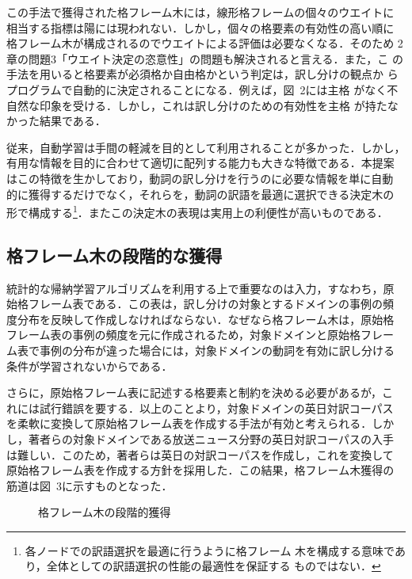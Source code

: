 この手法で獲得された格フレーム木には，線形格フレームの個々のウエイトに
相当する指標は陽には現われない．しかし，個々の格要素の有効性の高い順に
格フレーム木が構成されるのでウエイトによる評価は必要なくなる．そのため
2章の問題3「ウエイト決定の恣意性」の問題も解決されると言える．また，こ
の手法を用いると格要素が必須格か自由格かという判定は，訳し分けの観点か
らプログラムで自動的に決定されることになる．例えば，図~2には主格
がなく不自然な印象を受ける．しかし，これは訳し分けのための有効性を主格
が持たなかった結果である．

従来，自動学習は手間の軽減を目的として利用されることが多かった．しかし，
有用な情報を目的に合わせて適切に配列する能力も大きな特徴である．本提案
はこの特徴を生かしており，動詞の訳し分けを行うのに必要な情報を単に自動
的に獲得するだけでなく，それらを，動詞の訳語を最適に選択できる決定木の
形で構成する\footnote{各ノードでの訳語選択を最適に行うように格フレーム
  木を構成する意味であり，全体としての訳語選択の性能の最適性を保証する
  ものではない．}．またこの決定木の表現は実用上の利便性が高いものである．

\subsection{格フレーム木の段階的な獲得}

統計的な帰納学習アルゴリズムを利用する上で重要なのは入力，すなわち，原
始格フレーム表である．この表は，訳し分けの対象とするドメインの事例の頻
度分布を反映して作成しなければならない．なぜなら格フレーム木は，原始格
フレーム表の事例の頻度を元に作成されるため，対象ドメインと原始格フレー
ム表で事例の分布が違った場合には，対象ドメインの動詞を有効に訳し分ける
条件が学習されないからである．

さらに，原始格フレーム表に記述する格要素と制約を決める必要があるが，こ
れには試行錯誤を要する．以上のことより，対象ドメインの英日対訳コーパス
を柔軟に変換して原始格フレーム表を作成する手法が有効と考えられる．しか
し，著者らの対象ドメインである放送ニュース分野の英日対訳コーパスの入手
は難しい．このため，著者らは英日の対訳コーパスを作成し，これを変換して
原始格フレーム表を作成する方針を採用した．この結果，格フレーム木獲得の
筋道は図~3に示すものとなった．

\begin{figure}
  
\begin{center}
\end{center}
  \caption{格フレーム木の段階的獲得}
\end{figure}

